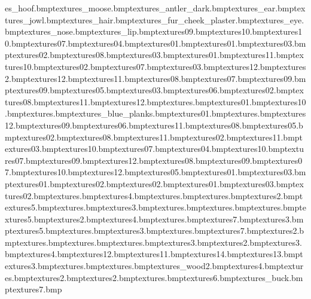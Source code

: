 es\moose_hoof.bmp textures\wood_moose.bmp textures\moose_antler_dark.bmp textures\moose_ear.bmp textures\moose_jowl.bmp textures\moose_hair.bmp textures\moose_fur_cheek_plaster.bmp textures\moose_eye.bmp textures\moose_nose.bmp textures\moose_lip.bmp textures\spookyfloor09.bmp textures\spookyrock10.bmp textures\spookyswirls10.bmp textures\spookyrock07.bmp textures\spookyrock04.bmp textures\spookyrock01.bmp textures\spookyentrance01.bmp textures\spookyentrance03.bmp textures\spookyentrance02.bmp textures\spookyfloor08.bmp textures\spookypath03.bmp textures\spookypath01.bmp textures\spookyfloor11.bmp textures\spookyfloor10.bmp textures\spookycob02.bmp textures\spookyfloor07.bmp textures\spookycob03.bmp textures\spookyfloor12.bmp textures\ghostspinnycog2.bmp textures\spookyswirls12.bmp textures\spookyswirls11.bmp textures\spookyswirls08.bmp textures\spookyswirls07.bmp textures\spookyswirls09.bmp textures\spookyrock09.bmp textures\spookyrock05.bmp textures\spookyrock03.bmp textures\spookyrock06.bmp textures\spookyrock02.bmp textures\spookyrock08.bmp textures\spookyrock11.bmp textures\spookyrock12.bmp textures\spookycoal.bmp textures\spookyplatform01.bmp textures\spookystake10.bmp textures\spookytrack.bmp textures\bh_blue_planks.bmp textures\spookyboards01.bmp textures\spookyjoiner.bmp textures\spookyneon12.bmp textures\spookyneon09.bmp textures\spookyrglow06.bmp textures\spookyneon11.bmp textures\spookyneon08.bmp textures\spookyrglow05.bmp textures\spookytrack02.bmp textures\spookyrglow08.bmp textures\spookyrglow11.bmp textures\spookyboards02.bmp textures\spookynorm11.bmp textures\spookyboards03.bmp textures\spookyneon10.bmp textures\spookyneon07.bmp textures\spookyrglow04.bmp textures\spookyrglow10.bmp textures\spookyrglow07.bmp textures\spookyrglow09.bmp textures\spookyrglow12.bmp textures\spookynorm08.bmp textures\spookynorm09.bmp textures\spookynorm07.bmp textures\spookynorm10.bmp textures\spookynorm12.bmp textures\spookystake05.bmp textures\spookystake01.bmp textures\spookytrunk03.bmp textures\spookytreestump01.bmp textures\spookytreestump02.bmp textures\spookyplatform02.bmp textures\spookycob01.bmp textures\spookyrglow03.bmp textures\spookypath02.bmp textures\ghostrockroof.bmp textures\ghostiles4.bmp textures\ghostilesedge.bmp textures\ghroofedge.bmp textures\ghostiles2.bmp textures\ghostiles5.bmp textures\ghostwalls.bmp textures\ghostwalls3.bmp textures\ghmouth.bmp textures\ghmouthgum.bmp textures\ghmouthend.bmp textures\ghostwalls5.bmp textures\ghostwalls2.bmp textures\ghostwalls4.bmp textures\ghostiles.bmp textures\ghostwalls7.bmp textures\ghostiles3.bmp textures\ghpanels5.bmp textures\ghcarpetshad.bmp textures\ghpanels3.bmp textures\ghcarpet.bmp textures\ghpanels7.bmp textures\ghrafters2.bmp textures\ghrafters.bmp textures\ghtilefloor.bmp textures\ghwallpaper.bmp textures\ghwallpaper3.bmp textures\ghwallpaper2.bmp textures\ghrafters3.bmp textures\ghwallpaper4.bmp textures\ghwallpaper12.bmp textures\ghwallpaper11.bmp textures\ghwallpaper14.bmp textures\ghwallpaper13.bmp textures\ghlibarypanels3.bmp textures\ghmouthplank.bmp textures\ghspookfence.bmp textures\mine_wood2.bmp textures\ghrafters4.bmp textures\ghbeamwall.bmp textures\ghpanels2.bmp textures\ghtilefloor2.bmp textures\ghroomend.bmp textures\ghwallpaper6.bmp textures\spookywall_buck.bmp textures\ghtilefloor7.bmp 
